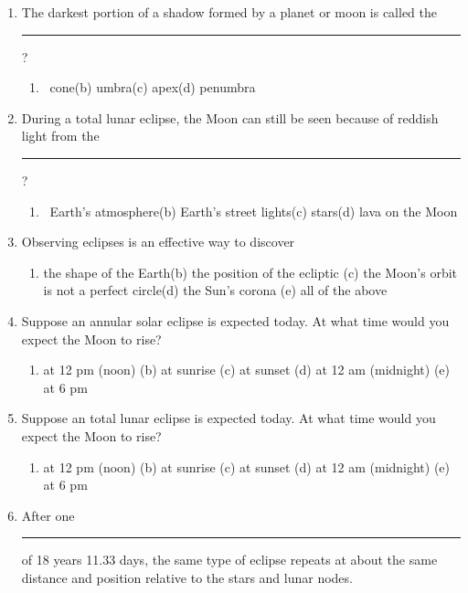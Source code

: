 \documentclass[12pt,thmsa]{article}
\begin{document}
\begin{enumerate}
\item  The darkest portion of a shadow formed by a planet or moon is called
the \rule{0.5in}{0.02in}?

\begin{enumerate}
\item  \ cone\qquad (b) umbra\qquad (c) apex\qquad (d) penumbra\qquad
\end{enumerate}

\item  During a total lunar eclipse, the Moon can still be seen because of
reddish light from the \rule{0.5in}{0.02in}?

\begin{enumerate}
\item  \ Earth's atmosphere\qquad (b) Earth's street lights\qquad (c)
stars\qquad (d) lava on the Moon\qquad
\end{enumerate}

\item  Observing eclipses is an effective way to discover

\begin{enumerate}
\item  the shape of the Earth\qquad (b) the position of the ecliptic\qquad
(c) the Moon's orbit is not a perfect circle\qquad (d) the Sun's corona
\qquad (e) all of the above
\end{enumerate}

\item Suppose an annular solar eclipse is expected today.  At what time would
you expect the Moon to rise?
 \begin{enumerate}
\item at 12 pm (noon) \qquad (b) at sunrise \qquad (c) at sunset
\quad (d) at 12 am (midnight) \qquad (e) at 6 pm
\end{enumerate}

\item Suppose an total lunar eclipse is expected today.  At what time would
you expect the Moon to rise?
 \begin{enumerate}
\item at 12 pm (noon) \qquad (b) at sunrise \qquad (c) at sunset
\quad (d) at 12 am (midnight) \qquad (e) at 6 pm
\end{enumerate}

\item  After one \rule{0.9in}{0.02in} of 18 years 11.33 days, the same type
of eclipse repeats at about the same distance and position relative to the stars
and lunar nodes.  


\end{enumerate}
\end{document}
